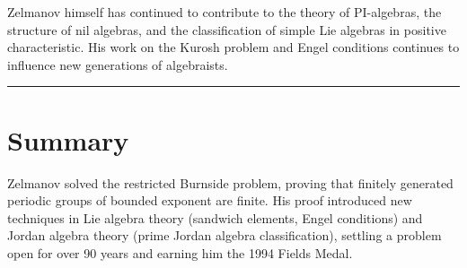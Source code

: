 Zelmanov himself has continued to contribute to the theory of
PI-algebras, the structure of nil algebras, and the classification
of simple Lie algebras in positive characteristic.  His work on
the Kurosh problem and Engel conditions continues to influence new
generations of algebraists.

\begin{center}\rule{0.5\linewidth}{0.5pt}\end{center}

\section*{Summary}

Zelmanov solved the restricted Burnside problem, proving that
finitely generated periodic groups of bounded exponent are finite.
His proof introduced new techniques in Lie algebra theory (sandwich
elements, Engel conditions) and Jordan algebra theory (prime Jordan
algebra classification), settling a problem open for over 90 years
and earning him the 1994 Fields Medal.

